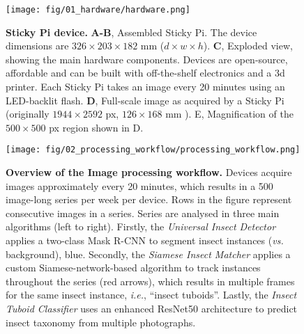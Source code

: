 \documentclass[12pt]{article}
\begin{document}
	
	
	\pagebreak
	\begin{figure}[ht]
		\centering
		\texttt{[image: fig/01\_hardware/hardware.png]}
		\caption{\textbf{Sticky Pi device.} \textbf{A-B}, Assembled Sticky Pi. The device dimensions are $326 \times{} 203 \times{} 182$ mm ($d \times{} w \times{} h$). \textbf{C}, Exploded view, showing the main hardware components. Devices are open-source, affordable and can be built with off-the-shelf electronics and a 3d printer. Each Sticky Pi takes an image every 20 minutes using an LED-backlit flash. \textbf{D}, Full-scale image as acquired by a Sticky Pi (originally $1944 \times{} 2592$ px, $126 \times{} 168$ mm ). E, Magnification of the $500 \times{} 500$ px region shown in D.}
		\label{fig:01}
	\end{figure}
	\pagebreak
	
	\begin{figure}[ht]
		\centering
		\texttt{[image: fig/02\_processing\_workflow/processing\_workflow.png]}
		\caption{\textbf{Overview of the Image processing workflow.} Devices acquire images approximately every 20 minutes, which results in a 500 image-long series per week per device. Rows in the figure represent consecutive images in a series. Series are analysed in three main algorithms (left to right). Firstly, the \emph{Universal Insect Detector} applies a two-class Mask R-CNN to segment insect instances (\emph{vs.} background), blue. Secondly, the \emph{Siamese Insect Matcher} applies a custom Siamese-network-based algorithm to track instances throughout the series (red arrows), which results in multiple frames for the same insect instance, \emph{i.e.}, “insect tuboids”. Lastly, the \emph{Insect Tuboid Classifier} uses an enhanced ResNet50 architecture to predict insect taxonomy from multiple photographs.}
		\label{fig:02}
	\end{figure}
	
	\pagebreak
	
\end{document}
